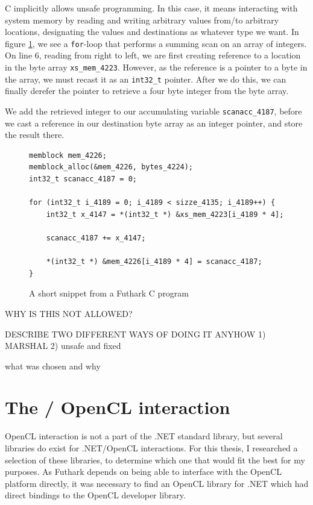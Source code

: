 C implicitly allows unsafe programming. In this case, it means interacting with system
memory by reading and writing arbitrary values from/to arbitrary locations,
designating the values and destinations as whatever type we want.
In figure \ref{fig:futharkcscene}, we see a \texttt{for}-loop that
performs a summing scan on an array of integers.
On line 6, reading from right to left, we are first creating reference to
a location in the byte array \texttt{xs\_mem\_4223}. However, as the reference
is a pointer to a byte in the array, we must recast it as an \texttt{int32\_t} pointer.
After we do this, we can finally derefer the pointer to retrieve a four byte
integer from the byte array.

We add the retrieved integer to our accumulating variable
\texttt{scanacc\_4187}, before we cast a reference in our destination byte array
as an integer pointer, and store the result there.

\begin{figure}
\centering
\begin{verbatim}
memblock mem_4226;
memblock_alloc(&mem_4226, bytes_4224);
int32_t scanacc_4187 = 0;

for (int32_t i_4189 = 0; i_4189 < sizze_4135; i_4189++) {
    int32_t x_4147 = *(int32_t *) &xs_mem_4223[i_4189 * 4];
    
    scanacc_4187 += x_4147;

    *(int32_t *) &mem_4226[i_4189 * 4] = scanacc_4187;
}
\end{verbatim}
\caption{A short snippet from a Futhark C program}
\label{fig:futharkcscene}
\end{figure}

WHY IS THIS NOT ALLOWED?

DESCRIBE TWO DIFFERENT WAYS OF DOING IT ANYHOW
1) MARSHAL
2) unsafe and fixed

what was chosen and why



\section{The \csharp{} / OpenCL interaction}
OpenCL interaction is not a part of the .NET standard library, but several
libraries do exist for .NET/OpenCL interactions. For this thesis, I researched a
selection of these libraries, to determine which one that would fit the best for
my purposes.
As Futhark depends on being able to interface with the OpenCL platform directly,
it was necessary to find an OpenCL library for .NET which had direct bindings to
the OpenCL developer library.

